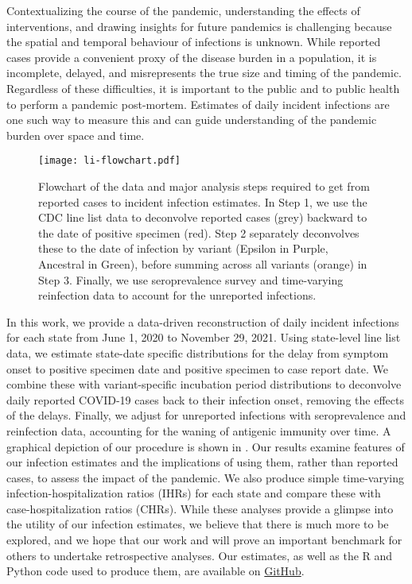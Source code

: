 Contextualizing the course of the pandemic, understanding the effects of
interventions, and drawing insights for future pandemics is challenging because
the spatial and temporal behaviour of infections is unknown. While reported
cases provide a convenient proxy of the disease burden in a population, it is
incomplete, delayed, and misrepresents the true size and timing of the pandemic.
Regardless of these difficulties, it is important to the public and to public
health to perform a pandemic post-mortem. Estimates of daily incident infections
are one such way to measure this and can guide understanding of the pandemic
burden over space and time. 

\begin{figure}[!tb]
\centering
    \texttt{[image: li-flowchart.pdf]} 
    \caption{Flowchart of the data and major analysis steps required to get from
    reported cases to incident infection estimates. In Step 1, we use the CDC
    line list data to deconvolve reported cases (grey) backward to the date of
    positive specimen (red). Step 2 separately deconvolves these to the date of
    infection by variant (Epsilon in Purple, Ancestral in Green), 
    before summing across all variants (orange)
    in Step 3. Finally, we use seroprevalence
    survey and time-varying reinfection data to account for the unreported
    infections.}
    \label{fig:cases_to_infect_flowchart}
\end{figure}
    

In this work, we provide a data-driven reconstruction of daily incident
infections for each \US state from June 1, 2020 to November 29, 2021. Using
state-level line list data, we estimate state-date specific distributions for
the delay from symptom onset to positive specimen date and positive specimen to
case report date. We combine these with variant-specific incubation period
distributions to deconvolve daily reported COVID-19 cases back to their
infection onset, removing the effects of the delays. Finally, we adjust for
unreported infections with seroprevalence and reinfection data, accounting for
the waning of antigenic immunity over time. A graphical depiction of our
procedure is shown in . Our results examine
features of our infection estimates and the implications of using them, rather
than reported cases, to assess the impact of the pandemic. We also produce
simple time-varying infection-hospitalization ratios (IHRs) for each state and
compare these with case-hospitalization ratios (CHRs). While these analyses
provide a glimpse into the utility of our infection estimates, we believe that
there is much more to be explored, and we hope that our work and will prove an
important benchmark for others to undertake retrospective analyses. Our
estimates, as well as the R and Python code used to produce them, are available
on \href{https://github.com/cmu-delphi/latent-infections/}{GitHub}.

